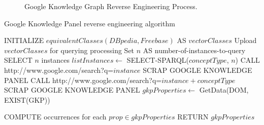 \begin{figure}[ht!bp]
\begin{center}

\caption{Google Knowledge Graph Reverse Engineering Process.}
\label{fig:gkpReverse}
\end{center}
\end{figure}



\begin{algorithm}[h]
\scriptsize
\caption{Google Knowledge Panel reverse engineering algorithm} \label{algoscrapping}
\begin{algorithmic}[1]
    \STATE INITIALIZE $equivalentClasses(DBpedia,Freebase) $ AS $vectorClasses$
    \STATE Upload $vectorClasses$ for querying processing
    \STATE Set $n$ AS number-of-instances-to-query
	\STATE SELECT $n$ instances
	\STATE $listInstances \leftarrow$ SELECT-SPARQL($conceptType$, $n$)
			\STATE CALL http://www.google.com/search?q=$instance$
				\STATE SCRAP GOOGLE KNOWLEDGE PANEL
			\ELSE
				\STATE CALL http://www.google.com/search?q=$instance + conceptType$
 				\STATE SCRAP GOOGLE KNOWLEDGE PANEL
			\ENDIF
			\STATE $gkpProperties \leftarrow$ GetData(DOM, EXIST(GKP))
			
		\ENDFOR
	\STATE COMPUTE occurrences for each $prop \in gkpProperties$
    \ENDFOR
    \STATE RETURN $gkpProperties$
\end{algorithmic}

\end{algorithm}


